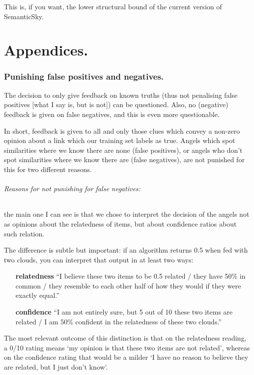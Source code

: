 \documentclass[11pt]{article}
\begin{document}
This is, if you want, the lower structural bound of the current version of SemanticSky.




\part{Appendices.}
\section{Punishing false positives and negatives.}

The decision to only give feedback on known truths (thus not penalising false positives [what I say is, but is not]) can be questioned. Also, no (negative) feedback is given on false negatives, and this is even more questionable.

In short, feedback is given to all and only those clues which convey a non-zero opinion about a link which our training set labels as true. Angels which spot similarities where we know there are none (false positives), or angels who don't spot similarities where we know there are (false negatives), are not punished for this for two different reasons.

\paragraph{Reasons for not punishing for false negatives:} the main one I can see is that we chose to interpret the decision of the angels not as opinions about the relatedness of items, but about confidence ratios about such relation.

The difference is subtle but important: if an algorithm returns 0.5 when fed with two clouds, you can interpret that output in at least two ways:

\begin{itemize}
\item[\textbf{relatedness}] ``I believe these two items to be 0.5 related / they have 50\% in common / they resemble to each other half of how they would if they were exactly equal.''
\item[\textbf{confidence}] ``I am not entirely sure, but 5 out of 10 these two items are related / I am 50\% confident in the relatedness of these two clouds.''
\end{itemize}

The most relevant outcome of this distinction is that on the relatedness reading, a 0/10 rating means `my opinion is that these two items are not related', whereas on the confidence rating that would be a milder `I have no reason to believe they are related, but I just don't know'.
\end{document}
